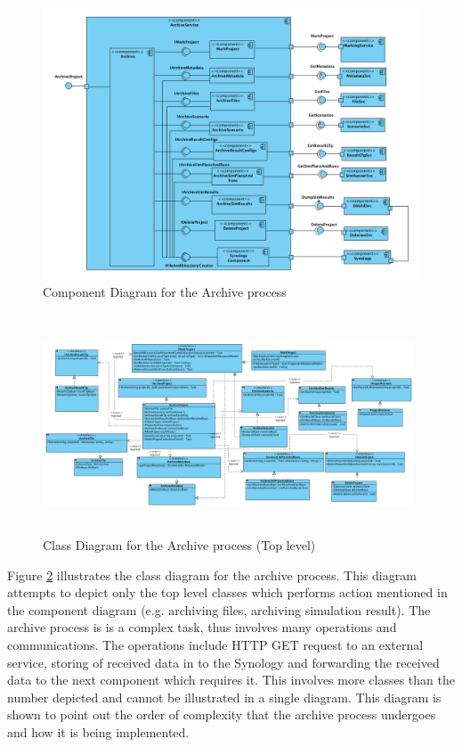 \begin{figure}[H]
    \centering \includegraphics[scale=0.45]{grafiken/archiveComponent.png}
    \caption{Component Diagram for the Archive process}
    \label{fig:archiveComponent}
\end{figure}



\begin{figure}[H]
    \centering \includegraphics[height=6.5cm, angle=90, origin=c, width=11cm]{grafiken/archiveClass.png}
    \caption{Class Diagram for the Archive process (Top level)}
    \label{fig:archiveClassDiagram}
\end{figure}

Figure \ref{fig:archiveClassDiagram} illustrates the class diagram for the archive process. This diagram attempts to depict only the top level classes
which performs action mentioned in the component diagram (e.g. archiving files, archiving simulation result). The archive process is is a complex 
task, thus involves many operations and communications. The operations include HTTP GET request to an external service, storing of received
data in to the Synology and forwarding the received data to the next component which requires it. This involves more classes than the number depicted
and cannot be illustrated in a single diagram. This diagram is shown to point out the order of complexity that the archive process undergoes and how it is being
implemented.

